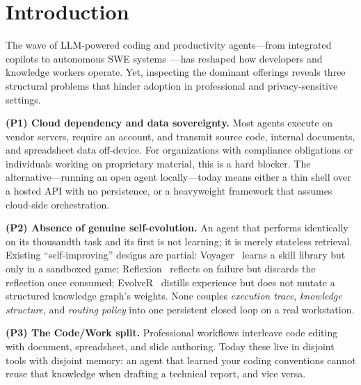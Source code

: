 \documentclass[sigconf]{acmart}
\begin{document}


\maketitle

\section{Introduction}\label{sec:intro}

The wave of LLM-powered coding and productivity agents---from integrated copilots to autonomous SWE systems~\cite{yang2024sweagent,wang2024openhands,cursor2024,cognition2024devin}---has reshaped how developers and knowledge workers operate. Yet, inspecting the dominant offerings reveals three structural problems that hinder adoption in professional and privacy-sensitive settings.

\textbf{(P1) Cloud dependency and data sovereignty.} Most agents execute on vendor servers, require an account, and transmit source code, internal documents, and spreadsheet data off-device. For organizations with compliance obligations or individuals working on proprietary material, this is a hard blocker. The alternative---running an open agent locally---today means either a thin shell over a hosted API with no persistence, or a heavyweight framework that assumes cloud-side orchestration.

\textbf{(P2) Absence of genuine self-evolution.} An agent that performs identically on its thousandth task and its first is not learning; it is merely stateless retrieval. Existing ``self-improving'' designs are partial: Voyager~\cite{wang2023voyager} learns a skill library but only in a sandboxed game; Reflexion~\cite{shinn2023reflexion} reflects on failure but discards the reflection once consumed; EvolveR~\cite{xu2026evolver} distills experience but does not mutate a structured knowledge graph's weights. None couples \emph{execution trace}, \emph{knowledge structure}, and \emph{routing policy} into one persistent closed loop on a real workstation.

\textbf{(P3) The Code/Work split.} Professional workflows interleave code editing with document, spreadsheet, and slide authoring. Today these live in disjoint tools with disjoint memory: an agent that learned your coding conventions cannot reuse that knowledge when drafting a technical report, and vice versa.
\end{document}
